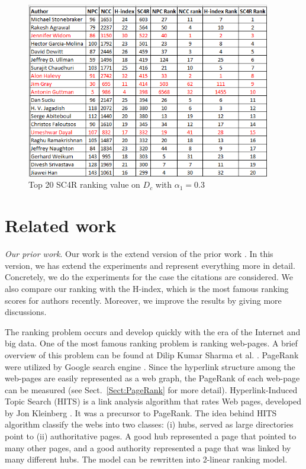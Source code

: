 \documentclass[10pt,leqno,twoside]{article}
\begin{document}
\begin{figure} %
	\caption{Top 20 SC4R ranking value on $D_c$ with $\alpha_1=0.3$}
	\label{Fig:Top20AuthorDetail}
    \centering
    \includegraphics[width=0.95\textwidth]{DCt20SC4Ra-f}
\end{figure}
%


\section{Related work}\label{Sect:Related}
\textit{Our prior work}. Our work is the extend version of the prior work \cite{Vu14}. In this version, we has extend the experiments and represent everything more in detail. Concretely, we do the experiments for the case the citations are considered. We also compare our ranking with the H-index, which is the most famous ranking scores for authors recently. Moreover, we improve the results by giving more discussions.

The ranking problem occurs and develop quickly with the era of the Internet and big data. One of the most famous ranking problem is ranking web-pages. A brief overview of this problem can be found at Dilip Kumar Sharma et al. \cite{RankOverview}. PageRank were utilized by Google search engine \cite{pagerank98}.
Since the hyperlink structure among the web-pages are easily represented as a web graph,
the PageRank of each web-page can be measured (see Sect.~\ref{Sect:PageRank} for more detail). Hyperlink-Induced Topic Search (HITS) is a link analysis algorithm that rates Web pages, developed by Jon Kleinberg \cite{HIndex}. It was a precursor to PageRank. The idea behind HITS algorithm classify the webs into two classes: (i) hubs, served as large directories point to (ii) authoritative pages. A good hub represented a page that pointed to many other pages, and a good authority represented a page that was linked by many different hubs. The model can be rewritten into 2-linear ranking model.
\end{document}
